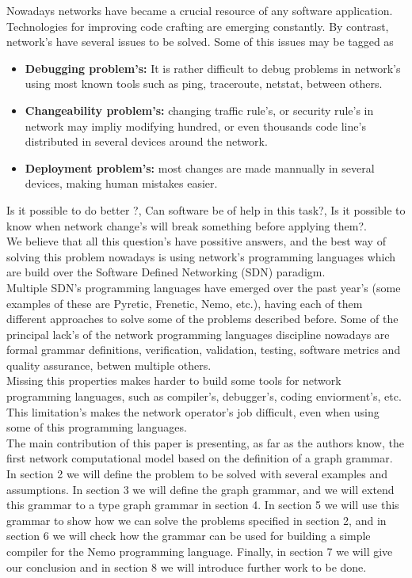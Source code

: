 \documentclass[envcountsect,runningheads]{llncs}
\begin{document}
Nowadays networks have became a crucial resource of any software application. 
Technologies for improving code crafting are emerging constantly. By contrast, network's have 
several issues to be solved. Some of this issues may be tagged as 
\begin{itemize}
  \item \textbf{Debugging problem's:} It is rather difficult to debug problems in network's using
  most known tools such as ping, traceroute, netstat, between others.
  \item \textbf{Changeability problem's:} changing traffic rule's, or 
security rule's in network may impliy modifying hundred, or even thousands code line's 
distributed in several devices around the network.
\item \textbf{Deployment problem's:} most changes are made mannually in several devices, 
making human mistakes easier.
\end{itemize}
Is it possible to do better ?, Can software be of help in this task?, Is it possible to know 
when network change's will break something before applying them?. \\
We believe that all this question's have possitive answers, and the best way of 
solving this problem nowadays is using network's programming languages which are 
build over the Software Defined Networking (SDN) paradigm.\\
Multiple SDN's programming languages have emerged over the past year's (some examples 
of these are Pyretic, Frenetic, Nemo, etc.), having each of them different approaches to solve 
some of the problems described before. Some of the principal lack's of the network 
programming languages discipline nowadays are formal grammar definitions, verification, 
validation, testing, software metrics and quality assurance, betwen multiple others. \\
Missing this properties makes harder to build some tools for network programming languages,
such as compiler's, debugger's, coding enviorment's, etc. This limitation's 
makes the network operator's job difficult, even when using some of this 
programming languages.\\
The main contribution of this paper is presenting, as far as the authors know, 
the first network computational model based on the definition of a graph 
grammar. In section 2 we will define the problem to be solved with several 
examples and assumptions. In section 3 we will define the graph grammar, and we 
will extend this grammar to a type graph grammar in section 4. In section 5 we 
will use this grammar to show how we can solve the problems specified in section 
2, and in section 6 we will check how the grammar can be used for building a 
simple compiler for the Nemo programming language. Finally, in section 7 we will 
give our conclusion and in section 8 we will introduce further work to be done.
\end{document}
